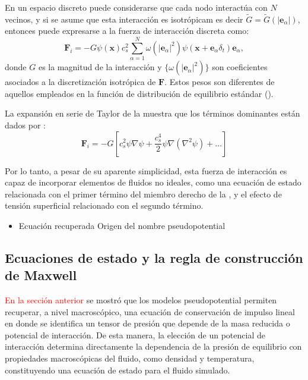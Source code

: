 En un espacio discreto puede considerarse que cada nodo interact\'ua con $N$ vecinos, y si se asume que esta interacci\'on es isotr\'opicam es decir $\tilde{G} = \tilde{G}(|\bm{e}_{\alpha}|)$, entonces puede expresarse a la fuerza de interacci\'on discreta como:
\begin{equation}
	\bm{F}_i = -G\psi(\bm{x})c_s^2 \sum_{\alpha=1}^N \omega(|\bm{e}_{\alpha}|^2)\psi(\bm{x}+\bm{e}_{\alpha}\delta_t)\bm{e}_{\alpha},
	\label{eq:f_int}
\end{equation}
donde $G$  es la magnitud de la interacci\'on y $\{\omega(|\bm{e}_{\alpha}|^2)\}$ son coeficientes asociados a la discretizaci\'on isotr\'opica de $\bm{F}$. Estos pesos son diferentes de 	aquellos empleados en la funci\'on de distribuci\'on de equilibrio est\'andar ().

La expansi\'on en serie de Taylor de la  muestra que los t\'erminos dominantes est\'an dados por \cite{shan_pressure_2008}:
\begin{equation}
	\bm{F}_i=-G\left[ c_s^2 \psi \nabla \psi + \dfrac{c_s^4}{2} \psi \nabla (\nabla^2 \psi)  + \ldots \right]
	\label{eq:f_int_taylor}
\end{equation}

Por lo tanto, a pesar de su aparente simplicidad, esta fuerza de interacci\'on es capaz de incorporar elementos de fluidos no ideales, como una ecuaci\'on de estado relacionada con el primer t\'ermino del miembro derecho de la , y el efecto de tensi\'on superficial relacionado con el segundo t\'ermino.

\begin{itemize}
	\item Ecuaci\'on recuperada
	Origen del nombre pseudopotential
\end{itemize}


\subsection{Ecuaciones de estado y la regla de construcci\'on de Maxwell}

\textcolor{red}{En la secci\'on anterior} se mostr\'o que los modelos pseudopotential permiten recuperar, a nivel macrosc\'opico, una ecuaci\'on de conservaci\'on de impulso lineal en donde se identifica un tensor de presi\'on que depende de la masa reducida o potencial de interacci\'on. De esta manera, la elecci\'on de un potencial de interacci\'on determina directamente la dependencia de la presi\'on de equilibrio con propiedades macrosc\'opicas del fluido, como densidad y temperatura, constituyendo una ecuaci\'on de estado para el fluido simulado. 

